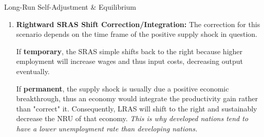 \documentclass[10pt]{article}
\begin{document}
\begin{core}{Long-Run Self-Adjustment \& Equilibrium}
\begin{enumerate}

        \item \textbf{Rightward SRAS Shift Correction/Integration:} The correction for this scenario depends on the time frame of the positive supply shock in question.

        If \textbf{temporary}, the SRAS simple shifts back to the right because higher employment will increase wages and thus input costs, decreasing output eventually.

        If \textbf{permanent}, the supply shock is usually due a positive economic breakthrough, thus an economy would integrate the productivity gain rather than "correct" it. Consequently, LRAS will shift to the right and sustainably decrease the NRU of that economy. \textit{This is why developed nations tend to have a lower unemployment rate than developing nations.}

\end{enumerate}
\end{core}
\end{document}
